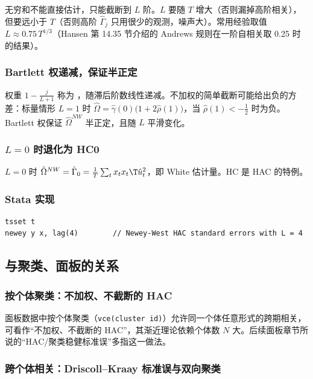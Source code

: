 无穷和不能直接估计，只能截断到 $L$ 阶。$L$ 要随 $T$ 增大（否则漏掉高阶相关），但要远小于 $T$（否则高阶 $\hat\Gamma_j$ 只用很少的观测，噪声大）。常用经验取值 $L\approx0.75\,T^{1/3}$（Hansen 第 14.35 节介绍的 Andrews 规则在一阶自相关取 0.25 时的结果）。

\subsubsection{Bartlett 权递减，保证半正定}

权重 $1-\frac j{L+1}$ 称为 ，随滞后阶数线性递减。不加权的简单截断可能给出负的方差：标量情形 $L=1$ 时 $\hat\Omega=\hat\gamma(0)\bigl(1+2\hat\rho(1)\bigr)$，当 $\hat\rho(1)<-\frac12$ 时为负。Bartlett 权保证 $\hat\Omega^{NW}$ 半正定，且随 $L$ 平滑变化。

\subsubsection{\texorpdfstring{$L=0$}{L = 0} 时退化为 HC0}

$L=0$ 时 $\hat\Omega^{NW}=\hat\Gamma_0=\frac1T\sum_tx_tx_t\T\hat u_t^2$，即 White 估计量。HC 是 HAC 的特例。

\subsubsection{Stata 实现}

\begin{lstlisting}
tsset t
newey y x, lag(4)        // Newey-West HAC standard errors with L = 4
\end{lstlisting}

\subsection{与聚类、面板的关系}

\subsubsection{按个体聚类：不加权、不截断的 HAC}

面板数据中按个体聚类（\texttt{vce(cluster id)}）允许同一个体任意形式的跨期相关，可看作“不加权、不截断的 HAC”，其渐近理论依赖个体数 $N$ 大。后续面板章节所说的“HAC/聚类稳健标准误”多指这一做法。

\subsubsection{跨个体相关：Driscoll--Kraay 标准误与双向聚类}

